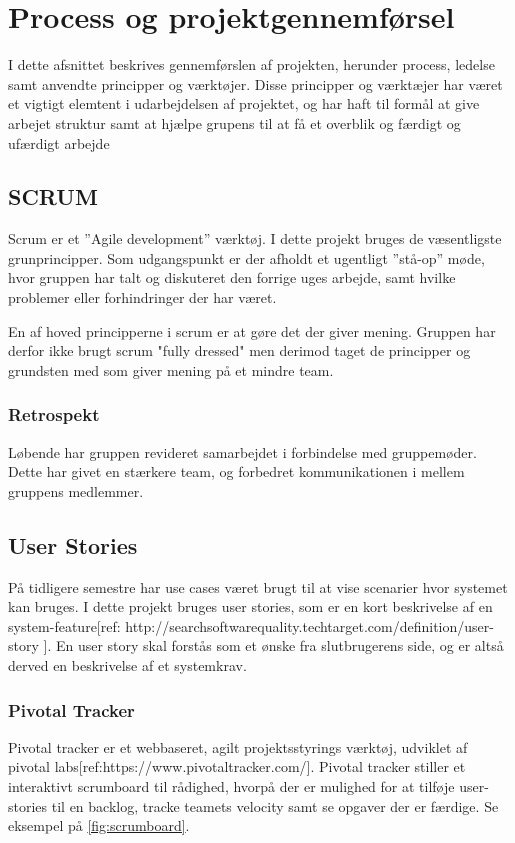 \chapter{Process og projektgennemførsel}

I dette afsnittet beskrives gennemførslen af projekten, herunder process, ledelse samt anvendte principper og værktøjer. Disse principper og værktæjer har været et vigtigt elemtent i udarbejdelsen af projektet, og har haft til formål at give arbejet struktur samt at hjælpe grupens til at få et overblik og færdigt og ufærdigt arbejde

\section{SCRUM}
Scrum er et ”Agile development” værktøj. I dette projekt bruges de væsentligste grunprincipper. Som udgangspunkt er der afholdt et ugentligt ”stå-op” møde, hvor gruppen har talt og diskuteret den forrige uges arbejde, samt hvilke problemer eller forhindringer der har været.

En af hoved principperne i scrum er at gøre det der giver mening. Gruppen har derfor ikke brugt scrum "fully dressed" men derimod taget de principper og grundsten med som giver mening på et mindre team.

\subsection{Retrospekt}
Løbende har gruppen revideret samarbejdet i forbindelse med gruppemøder. Dette har givet en stærkere team, og forbedret kommunikationen i mellem gruppens medlemmer.

\section{User Stories}
På tidligere semestre har use cases været brugt til at vise scenarier hvor systemet kan bruges. I dette projekt bruges user stories, som er en kort beskrivelse af en system-feature[ref: http://searchsoftwarequality.techtarget.com/definition/user-story ]. En user story skal forstås som et ønske fra slutbrugerens side, og er altså derved en beskrivelse af et systemkrav.

\subsection{Pivotal Tracker}
Pivotal tracker er et webbaseret, agilt projektsstyrings værktøj, udviklet af pivotal labs[ref:https://www.pivotaltracker.com/]. Pivotal tracker stiller et interaktivt scrumboard til rådighed, hvorpå der er mulighed for at tilføje user-stories til en backlog, tracke teamets velocity samt se opgaver der er færdige. Se eksempel på \ref{fig:scrumboard}.

